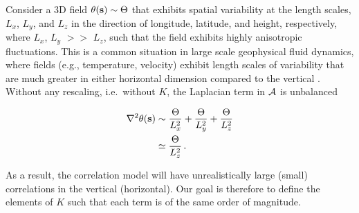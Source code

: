 Consider a 3D field $\theta(\mathbf{s})\sim \Theta$ that exhibits spatial variability at the
length scales, $L_x$, $L_y$, and $L_z$ in the direction of longitude, latitude,
and height, respectively,
where $L_x$, $L_y$ $>>$ $L_z$, such that the field exhibits highly
anisotropic fluctuations.
This is a common situation in large scale geophysical fluid
dynamics, where fields (e.g., temperature, velocity) exhibit length scales of
variability that are much greater in either horizontal dimension compared to the
vertical \citep[e.g.,][]{vallis2006}.
Without any rescaling, i.e.\ without $K$,
the Laplacian term in $\mathcal{A}$ is unbalanced
\begin{linenomath*}\begin{equation}
    \begin{aligned}
        \nabla^2 \theta(\mathbf{s})
            & \sim \dfrac{\Theta}{L_x^2} + \dfrac{\Theta}{L_y^2} + \dfrac{\Theta}{L_z^2} \\
            & \simeq \dfrac{\Theta}{L_z^2} \, .
    \end{aligned}
    \label{eq:iso_lap}
\end{equation}\end{linenomath*}
As a result, the correlation model will
have unrealistically large (small) correlations in the vertical (horizontal).
Our goal is therefore to define the elements of $K$ such that each term is of
the same order of magnitude.

